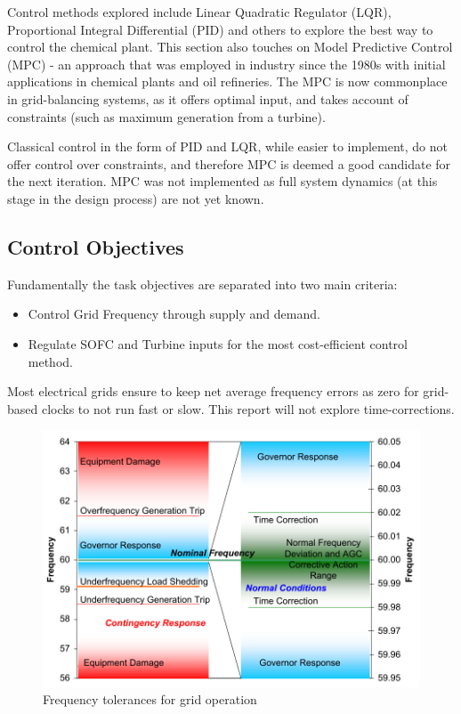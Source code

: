 Control methods explored include Linear Quadratic Regulator (LQR), Proportional Integral Differential (PID) and others to explore the best way to control the chemical plant. This section also touches on Model Predictive Control (MPC) - an approach that was employed in industry since the 1980s with initial applications in chemical plants and oil refineries.
The MPC is now commonplace in grid-balancing systems, as it offers optimal input, and takes account of constraints (such as maximum generation from a turbine). \cite{power:mpcadvs}

Classical control in the form of PID and LQR, while easier to implement, do not offer control over constraints, and therefore MPC is deemed a good candidate for the next iteration.
MPC was not implemented as full system dynamics (at this stage in the design process) are not yet known.

\subsection{Control Objectives}

Fundamentally the task objectives are separated into two main criteria:
\begin{itemize}
\item{Control Grid Frequency through supply and demand.}
\item{Regulate SOFC and Turbine inputs for the most cost-efficient control method.}
\end{itemize}
Most electrical grids ensure to keep net average frequency errors as zero for grid-based clocks to not run fast or slow. This report will not explore time-corrections. \cite{power:timecorrection}

\begin{figure}[htb]
\centering
        \includegraphics[scale=0.7]{images/freq.pdf}
\caption{Frequency tolerances for grid operation \cite{power:freqs}}
\label{fig:freqgrid}
\end{figure}

